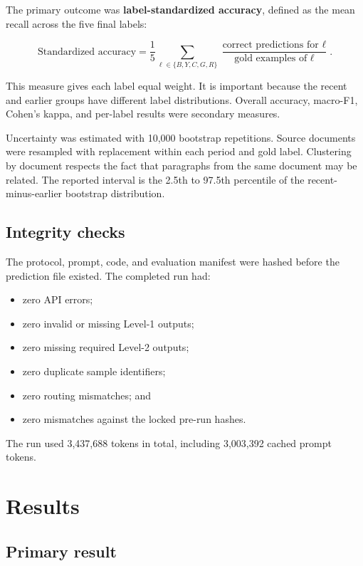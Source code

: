 \documentclass[11pt]{article}
\begin{document}
The primary outcome was \textbf{label-standardized accuracy}, defined as the mean recall across the five final labels:

\[
\text{Standardized accuracy}
=\frac{1}{5}\sum_{\ell \in \{B,Y,C,G,R\}}
\frac{\text{correct predictions for }\ell}{\text{gold examples of }\ell}.
\]

This measure gives each label equal weight. It is important because the recent and earlier groups have different label distributions. Overall accuracy, macro-F1, Cohen's kappa, and per-label results were secondary measures.

Uncertainty was estimated with 10,000 bootstrap repetitions. Source documents were resampled with replacement within each period and gold label. Clustering by document respects the fact that paragraphs from the same document may be related. The reported interval is the 2.5th to 97.5th percentile of the recent-minus-earlier bootstrap distribution.

\subsection{Integrity checks}

The protocol, prompt, code, and evaluation manifest were hashed before the prediction file existed. The completed run had:

\begin{itemize}
    \item zero API errors;
    \item zero invalid or missing Level-1 outputs;
    \item zero missing required Level-2 outputs;
    \item zero duplicate sample identifiers;
    \item zero routing mismatches; and
    \item zero mismatches against the locked pre-run hashes.
\end{itemize}

The run used 3,437,688 tokens in total, including 3,003,392 cached prompt tokens.

\section{Results}

\subsection{Primary result}
\end{document}
